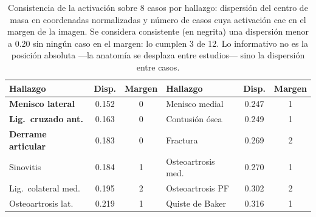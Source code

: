 \begin{table}[ht]
\centering
\caption{Consistencia de la activación sobre 8 casos por hallazgo: dispersión del centro de masa en coordenadas normalizadas y número de casos cuya activación cae en el margen de la imagen. Se considera consistente (en negrita) una dispersión menor a 0.20 sin ningún caso en el margen: lo cumplen 3 de 12. Lo informativo no es la posición absoluta ---la anatomía se desplaza entre estudios--- sino la dispersión entre casos.}
\label{tab:patron}
\begin{tabular}{lcc@{\qquad}lcc}
\toprule
Hallazgo & Disp. & Margen & Hallazgo & Disp. & Margen \\
\midrule
\textbf{Menisco lateral} & 0.152 & 0 & Menisco medial & 0.247 & 1 \\
\textbf{Lig.\ cruzado ant.} & 0.163 & 0 & Contusión ósea & 0.249 & 1 \\
\textbf{Derrame articular} & 0.183 & 0 & Fractura & 0.269 & 2 \\
Sinovitis & 0.184 & 1 & Osteoartrosis med. & 0.270 & 1 \\
Lig.\ colateral med. & 0.195 & 2 & Osteoartrosis PF & 0.302 & 2 \\
Osteoartrosis lat. & 0.219 & 1 & Quiste de Baker & 0.316 & 1 \\
\bottomrule
\end{tabular}
\end{table}
